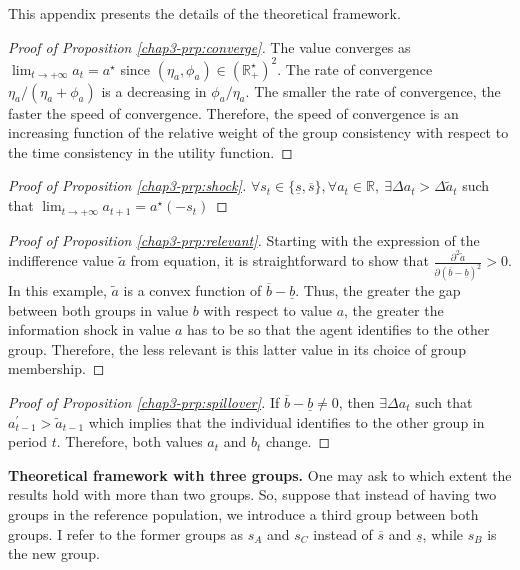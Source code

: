This appendix presents the details of the theoretical framework.

\begin{proof}[Proof of Proposition \ref{chap3-prp:converge}]
    The value converges as $\lim_{t\to+\infty} a_t = a^\star$ since $(\eta_a,\phi_a)\in(\mathbb{R}^\star_{+})^2$. The rate of convergence $\eta_a/(\eta_a+\phi_a)$ is a decreasing in $\phi_a/\eta_a$. The smaller the rate of convergence, the faster the speed of convergence. Therefore, the speed of convergence is an increasing function of the relative weight of the group consistency with respect to the time consistency in the utility function.
\end{proof}

\begin{proof}[Proof of Proposition \ref{chap3-prp:shock}]
$\forall s_t\in\{\underline{s}, \overline{s}\}, \forall a_t\in\mathbb{R},~\exists \Delta{a_t} > \Delta\widetilde{a}_t$ such that $\lim_{t\to+\infty} a_{t+1} = a^\star(-s_t)$
\end{proof}

\begin{proof}[Proof of Proposition \ref{chap3-prp:relevant}]
Starting with the expression of the indifference value $\widetilde{a}$ from equation, it is straightforward to show that $\frac{\partial^2\widetilde{a}}{\partial(\overline{b}-\underline{b})^2}>0$. In this example, $\widetilde{a}$ is a convex function of $\overline{b}-\underline{b}$. Thus, the greater the gap between both groups in value $b$ with respect to value $a$, the greater the information shock in value $a$ has to be so that the agent identifies to the other group. Therefore, the less relevant is this latter value in its choice of group membership.
\end{proof}

\begin{proof}[Proof of Proposition \ref{chap3-prp:spillover}]
If $\overline{b}-\underline{b}\neq 0$, then $\exists \Delta{a_t}$ such that $a_{t-1}^\prime > \widetilde{a}_{t-1}$ which implies that the individual identifies to the other group in period $t$. Therefore, both values $a_t$ and $b_t$ change.
\end{proof}

\textbf{Theoretical framework with three groups.}
One may ask to which extent the results hold with more than two groups. So, suppose that instead of having two groups in the reference population, we introduce a third group between both groups. I refer to the former groups as $s_A$ and $s_C$ instead of $\overline{s}$ and $\underline{s}$, while $s_B$ is the new group.

